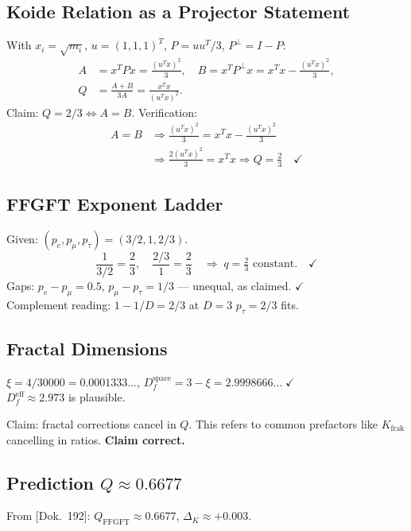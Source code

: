 \subsection{Koide Relation as a Projector Statement}

With $x_i=\sqrt{m_i}$, $u=(1,1,1)^T$, $P=uu^T/3$, $P^\perp=I-P$:
\begin{align*}
  A &= x^TPx = \frac{(u^Tx)^2}{3}, \quad
  B = x^TP^\perp x = x^Tx-\frac{(u^Tx)^2}{3}, \\
  Q &= \frac{A+B}{3A} = \frac{x^Tx}{(u^Tx)^2}.
\end{align*}
Claim: $Q=2/3 \Leftrightarrow A=B$. Verification:
\begin{align*}
  A=B &\Rightarrow \frac{(u^Tx)^2}{3}=x^Tx-\frac{(u^Tx)^2}{3} \\
  &\Rightarrow \frac{2(u^Tx)^2}{3}=x^Tx
  \Rightarrow Q=\frac{2}{3} \quad\checkmark
\end{align*}

\subsection{FFGFT Exponent Ladder}

Given: $(p_e,p_\mu,p_\tau)=(3/2,1,2/3)$.
\[
  \frac{1}{3/2}=\frac{2}{3}, \quad \frac{2/3}{1}=\frac{2}{3}
  \quad\Rightarrow\; q=\tfrac{2}{3}\text{ constant.}\quad\checkmark
\]
Gaps: $p_e-p_\mu=0.5$, $p_\mu-p_\tau=1/3$ --- unequal, as claimed. $\checkmark$\\
Complement reading: $1-1/D=2/3$ at $D=3$ \textrightarrow{} $p_\tau=2/3$ fits.

\subsection{Fractal Dimensions}

$\xi=4/30000=0.0001333\ldots$,
$D_f^{\text{space}}=3-\xi=2.9998666\ldots\;\checkmark$\\
$D_f^{\text{eff}}\approx2.973$ is plausible.

Claim: fractal corrections cancel in $Q$. This refers to common prefactors like
$K_{\text{frak}}$ cancelling in ratios. \textbf{Claim correct.}

\subsection{Prediction $Q\approx0.6677$}

From [Dok.~192]: $Q_{\text{FFGFT}}\approx0.6677$, $\Delta_K\approx+0.003$.

